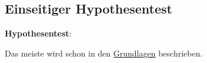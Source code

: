 \subsection{Einseitiger Hypothesentest}

\textbf{Hypothesentest}:

Das meiste wird schon in den 
\hyperref[sec:hypothesengrundlagen]{Grundlagen}
beschrieben.


